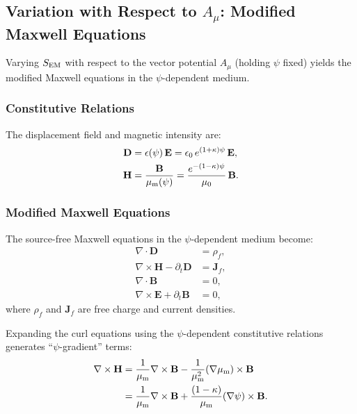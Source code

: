\documentclass[aps,prd,twocolumn,superscriptaddress,floatfix,nofootinbib]{revtex4-2}
\newcommand{\kap}{\kappa}
\begin{document}
\subsection{Variation with Respect to $A_\mu$: Modified Maxwell
Equations}\label{sec:var-A}

Varying $S_{\rm EM}$ with respect to the vector potential $A_\mu$
(holding $\psi$ fixed) yields the modified Maxwell equations in the
$\psi$-dependent medium.

\subsubsection{Constitutive Relations}

The displacement field and magnetic intensity are:
\begin{align}
\mathbf{D} &= \epsilon(\psi)\,\mathbf{E}
= \epsilon_0\,e^{(1+\kap)\psi}\,\mathbf{E}, \\
\mathbf{H} &= \frac{\mathbf{B}}{\mu_{\rm m}(\psi)}
= \frac{e^{-(1-\kap)\psi}}{\mu_0}\,\mathbf{B}.
\end{align}

\subsubsection{Modified Maxwell Equations}

The source-free Maxwell equations in the $\psi$-dependent medium become:
\begin{align}
\nabla\cdot\mathbf{D} &= \rho_f, \label{eq:gauss}\\
\nabla\times\mathbf{H} - \partial_t\mathbf{D} &= \mathbf{J}_f,
\label{eq:ampere}\\
\nabla\cdot\mathbf{B} &= 0, \label{eq:divB}\\
\nabla\times\mathbf{E} + \partial_t\mathbf{B} &= 0,
\label{eq:faraday}
\end{align}
where $\rho_f$ and $\mathbf{J}_f$ are free charge and current densities.

Expanding the curl equations using the $\psi$-dependent constitutive
relations generates ``$\psi$-gradient'' terms:
\begin{align}
\nabla\times\mathbf{H} &= \frac{1}{\mu_{\rm m}}\nabla\times\mathbf{B}
- \frac{1}{\mu_{\rm m}^2}(\nabla\mu_{\rm m})\times\mathbf{B} \notag\\
&= \frac{1}{\mu_{\rm m}}\nabla\times\mathbf{B}
+ \frac{(1-\kap)}{\mu_{\rm m}}(\nabla\psi)\times\mathbf{B}.
\label{eq:curl-H}
\end{align}
\end{document}
